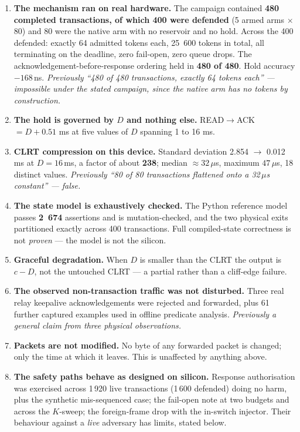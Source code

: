 \documentclass[10pt,a4paper,oneside]{article}
\newcommand{\num}[1]{\mbox{#1}}
\begin{document}
\begin{enumerate}[leftmargin=1.5em,itemsep=0.25em]
\item \textbf{The mechanism ran on real hardware.} The campaign contained \textbf{480
  completed transactions, of which 400 were defended} (5 armed arms $\times$ 80) and 80 were
  the native arm with no reservoir and no hold. Across the 400 defended: exactly 64 admitted
  tokens each, \num{25 600} tokens in total, all terminating on the deadline, zero
  fail-open, zero queue drops. The acknowledgement-before-response ordering held in
  \textbf{480 of 480}. Hold accuracy $-\num{168}$\,ns.
  \emph{Previously ``480 of 480 transactions, exactly 64 tokens each'' --- impossible
  under the stated campaign, since the native arm has no tokens by construction.}
\item \textbf{The hold is governed by $D$ and nothing else.} READ$\to$ACK $=D+\num{0.51}$ ms
  at five values of $D$ spanning 1 to 16 ms.
\item \textbf{CLRT compression on this device.} Standard deviation \num{2.854} $\to$
  \num{0.012}\,ms at $D=16$\,ms, a factor of about \textbf{238}; median ${\approx}32\,\mu$s,
  maximum $47\,\mu$s, 18 distinct values.
  \emph{Previously ``80 of 80 transactions flattened onto a 32\,$\mu$s constant''
  --- false.}
\item \textbf{The state model is exhaustively checked.} The Python reference model passes
  \textbf{\num{2 674}} assertions and is mutation-checked, and the two physical exits
  partitioned exactly across 400 transactions. Full compiled-state correctness is not
  \emph{proven} --- the model is not the silicon.

\item \textbf{Graceful degradation.} When $D$ is smaller than the CLRT the output is $c-D$,
  not the untouched CLRT --- a partial rather than a cliff-edge failure.
\item \textbf{The observed non-transaction traffic was not disturbed.} Three real relay
  keepalive acknowledgements were rejected and forwarded, plus 61 further captured examples
  used in offline predicate analysis.
  \emph{Previously a general claim from three physical observations.}
\item \textbf{Packets are not modified.} No byte of any forwarded packet is changed; only
  the time at which it leaves. This is unaffected by anything above.
\item \textbf{The safety paths behave as designed on silicon.} Response authorisation was
  exercised across 1\,920 live transactions (1\,600 defended) doing no harm, plus the
  synthetic mis-sequenced case; the fail-open note at two budgets and across the $K$-sweep;
  the foreign-frame drop with the in-switch injector. Their behaviour against a \emph{live}
  adversary has limits, stated below.


\end{enumerate}
\end{document}
